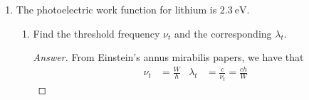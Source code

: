 \documentclass[../psets.tex]{subfiles}
\begin{document}
\begin{enumerate}
\begin{enumerate}
\begin{proof}
\begin{align*}
                &= \int_{x=0}^\infty\frac{8\pi(kT)^4x^3}{(hc)^3(\e[x]-1)}\\
                &= \frac{8\pi(kT)^4}{(hc)^3}\int_0^\infty\frac{x^3}{\e[x]-1}\dd{x}\\
                &= \frac{8\pi(kT)^4}{(hc)^3}\cdot\frac{\pi^4}{15}\\
                &= \frac{8\pi^5k^4}{15h^3c^3}T^4\\
                &= aT^4
            \end{align*}
            as desired.
        \end{proof}
        \item Does this agree with the Stefan-Boltzmann law for the total emissive power?
        \begin{proof}[Answer]
            Yes --- we are given the conversion factor $\rho(\lambda,T)=4/c\cdot R(\lambda,T)$, so from the above, we should have
            \begin{align*}
                R(T) &= \frac{c}{4}\cdot R(\lambda,T)\\
                &= \frac{c}{4}\cdot\frac{8\pi^5k^4}{15h^3c^3}T^4\\
                &= \frac{2\pi^5k^4}{15h^3c^2}T^4
            \end{align*}
            But by plugging in the appropriate values, we can determine that
            \begin{equation*}
                \frac{2\pi^5k^4}{15h^3c^2} = \sigma
            \end{equation*}
            where $\sigma$ is Stefan's constant, giving us
            \begin{equation*}
                R(T) = \sigma T^4
            \end{equation*}
            as desired.
        \end{proof}
    \end{enumerate}
    \item The photoelectric work function for lithium is $\SI{2.3}{\electronvolt}$.
    \begin{enumerate}
        \item Find the threshold frequency $\nu_t$ and the corresponding $\lambda_t$.
        \begin{proof}[Answer]
            From Einstein's annus mirabilis papers, we have that
            \begin{align*}
                \nu_t &= \frac{W}{h}&
                \lambda_t &= \frac{c}{\nu_t} = \frac{ch}{W}
            \end{align*}

\end{proof}
\end{enumerate}
\end{enumerate}
\end{document}
